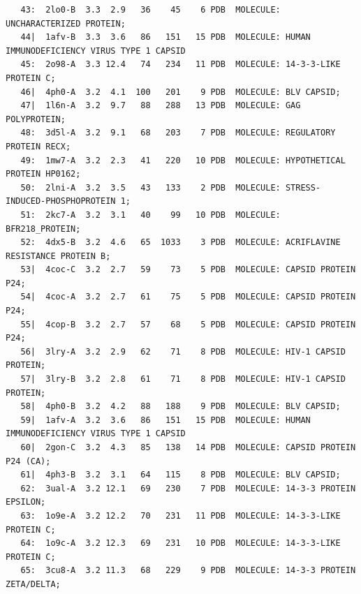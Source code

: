 \documentclass{bmcart}
\begin{document}
\begin{verbatim}
   43:  2lo0-B  3.3  2.9   36    45    6 PDB  MOLECULE: UNCHARACTERIZED PROTEIN;                                   
   44|  1afv-B  3.3  3.6   86   151   15 PDB  MOLECULE: HUMAN IMMUNODEFICIENCY VIRUS TYPE 1 CAPSID                 
   45:  2o98-A  3.3 12.4   74   234   11 PDB  MOLECULE: 14-3-3-LIKE PROTEIN C;                                     
   46|  4ph0-A  3.2  4.1  100   201    9 PDB  MOLECULE: BLV CAPSID;                                                
   47|  1l6n-A  3.2  9.7   88   288   13 PDB  MOLECULE: GAG POLYPROTEIN;                                           
   48:  3d5l-A  3.2  9.1   68   203    7 PDB  MOLECULE: REGULATORY PROTEIN RECX;                                   
   49:  1mw7-A  3.2  2.3   41   220   10 PDB  MOLECULE: HYPOTHETICAL PROTEIN HP0162;                               
   50:  2lni-A  3.2  3.5   43   133    2 PDB  MOLECULE: STRESS-INDUCED-PHOSPHOPROTEIN 1;                           
   51:  2kc7-A  3.2  3.1   40    99   10 PDB  MOLECULE: BFR218_PROTEIN;                                            
   52:  4dx5-B  3.2  4.6   65  1033    3 PDB  MOLECULE: ACRIFLAVINE RESISTANCE PROTEIN B;                          
   53|  4coc-C  3.2  2.7   59    73    5 PDB  MOLECULE: CAPSID PROTEIN P24;                                        
   54|  4coc-A  3.2  2.7   61    75    5 PDB  MOLECULE: CAPSID PROTEIN P24;                                        
   55|  4cop-B  3.2  2.7   57    68    5 PDB  MOLECULE: CAPSID PROTEIN P24;                                        
   56|  3lry-A  3.2  2.9   62    71    8 PDB  MOLECULE: HIV-1 CAPSID PROTEIN;                                      
   57|  3lry-B  3.2  2.8   61    71    8 PDB  MOLECULE: HIV-1 CAPSID PROTEIN;                                      
   58|  4ph0-B  3.2  4.2   88   188    9 PDB  MOLECULE: BLV CAPSID;                                                
   59|  1afv-A  3.2  3.6   86   151   15 PDB  MOLECULE: HUMAN IMMUNODEFICIENCY VIRUS TYPE 1 CAPSID                 
   60|  2gon-C  3.2  4.3   85   138   14 PDB  MOLECULE: CAPSID PROTEIN P24 (CA);                                   
   61|  4ph3-B  3.2  3.1   64   115    8 PDB  MOLECULE: BLV CAPSID;                                                
   62:  3ual-A  3.2 12.1   69   230    7 PDB  MOLECULE: 14-3-3 PROTEIN EPSILON;                                    
   63:  1o9e-A  3.2 12.2   70   231   11 PDB  MOLECULE: 14-3-3-LIKE PROTEIN C;                                     
   64:  1o9c-A  3.2 12.3   69   231   10 PDB  MOLECULE: 14-3-3-LIKE PROTEIN C;                                     
   65:  3cu8-A  3.2 11.3   68   229    9 PDB  MOLECULE: 14-3-3 PROTEIN ZETA/DELTA;                                 

\end{verbatim}
\end{document}
